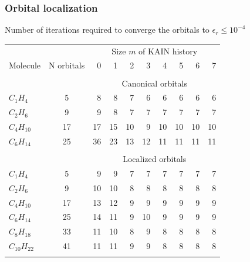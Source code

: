 \begin{frame}
\frametitle{Orbital localization}
    \centering
    Number of iterations required to converge the orbitals to $\epsilon_r \leq 10^{-4}$
\begin{table}
\tiny
\centering
\begin{tabular}{lcrrrrrrrr}
\hline
\hline
	    &		&\multicolumn{8}{c}{Size $m$ of KAIN history}\\
Molecule    & N orbitals&  0	&  1    &  2    &  3    &  4    &  5    &  6    &  7    \\
\hline
              	&   	&       &       &       &       &       &       &       &       \\
&&\multicolumn{8}{c}{Canonical orbitals}\\
$C_{ 1}H_{ 4}$	&  5    &  8    &  8    &  7    &  6    &  6    &  6    &  6    &  6    \\ 
$C_{ 2}H_{ 6}$	&  9    &  9    &  8    &  7    &  7    &  7    &  7    &  7    &  7    \\ 
$C_{ 4}H_{10}$	& 17    & 17    & 15    & 10    &  9    & 10    & 10    & 10    & 10    \\
$C_{ 6}H_{14}$	& 25	& 36    & 23    & 13    & 12    & 11    & 11    & 11    & 11    \\
              	&   	&       &       &       &       &       &       &       &       \\
&&\multicolumn{8}{c}{Localized orbitals}\\
$C_{ 1}H_{ 4}$	&  5	&  9    &  9    &  7    &  7    &  7    &  7    &  7    &  7    \\ 
$C_{ 2}H_{ 6}$	&  9	& 10    & 10    &  8    &  8    &  8    &  8    &  8    &  8    \\ 
$C_{ 4}H_{10}$	& 17	& 13    & 12    &  9    &  9    &  9    &  9    &  9    &  9    \\
$C_{ 6}H_{14}$	& 25	& 14    & 11    &  9    & 10    &  9    &  9    &  9    &  9    \\
$C_{ 8}H_{18}$	& 33	& 11    & 10    &  8    &  9    &  8    &  8    &  8    &  8    \\
$C_{10}H_{22}$	& 41	& 11    & 11    &  9    &  9    &  8    &  8    &  8    &  8    \\
              	&   	&       &       &       &       &       &       &       &       \\
\hline
\hline
\end{tabular}
\end{table}
\ \\
\ \\

\end{frame}
